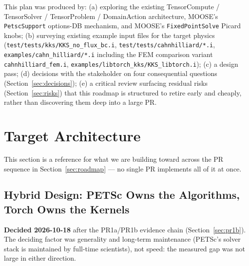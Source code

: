 \documentclass[11pt]{article}
\begin{document}
This plan was produced by: (a) exploring the existing TensorCompute /
TensorSolver / TensorProblem / DomainAction architecture, MOOSE's
\texttt{PetscSupport} options-DB mechanism, and MOOSE's \texttt{FixedPointSolve}
Picard knobs; (b) surveying existing example input files for the target
physics (\texttt{test/tests/kks/KKS\_no\_flux\_bc.i},
\texttt{test/tests/cahnhilliard/*.i}, \texttt{examples/cahn\_hilliard/*.i}
including the FEM comparison variant \texttt{cahnhilliard\_fem.i},
\texttt{examples/libtorch\_kks/KKS\_libtorch.i}); (c) a design pass; (d)
decisions with the stakeholder on four consequential questions
(Section~\ref{sec:decisions}); (e) a critical review surfacing residual
risks (Section~\ref{sec:risks}) that this roadmap is structured to retire
early and cheaply, rather than discovering them deep into a large PR.

\section{Target Architecture}
\label{sec:architecture}

This section is a reference for what we are building toward across the PR
sequence in Section~\ref{sec:roadmap} --- no single PR implements all of it
at once.

\subsection{Hybrid Design: PETSc Owns the Algorithms, Torch Owns the Kernels}
\label{sec:hybrid}

\begin{tcolorbox}[colback=lightgray, colframe=marlinblue, boxrule=0.6pt, arc=1mm]
\textbf{Decided 2026-10-18} after the PR1a/PR1b evidence chain
(Section~\ref{sec:pr1b}). The deciding factor was generality and long-term
maintenance (PETSc's solver stack is maintained by full-time scientists),
not speed: the measured gap was not large in either direction.
\end{tcolorbox}
\end{document}
